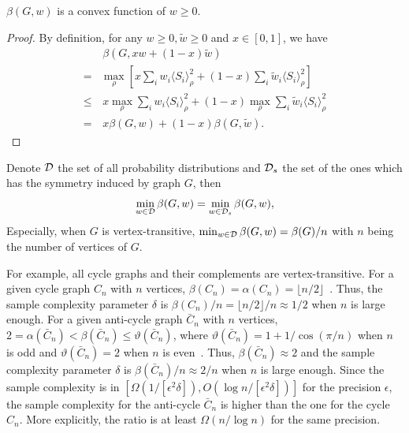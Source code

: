 \begin{lemma}
  $\beta(G,w)$ is a convex function of $w \ge 0$.
\end{lemma}
\begin{proof}
  By definition, for any $w\ge 0, \tilde{w}\ge 0$ and $x\in [0,1]$, we have
  \begin{align}
   & \,\beta(G,x w + (1-x) \tilde{w})\nonumber\\ 
    =& \max_{\rho}[x \sum_i w_{i} \langle S_i\rangle_{\rho}^2 + (1-x) \sum_i \tilde{w}_{i} \langle S_i\rangle_{\rho}^2]\nonumber\\
    \le& \,x\max_{\rho} \sum_i w_{i} \langle S_i\rangle_{\rho}^2 + (1-x) \max_{\rho}\sum_i \tilde{w}_{i} \langle S_i\rangle_{\rho}^2\nonumber\\
    =& \,x \beta(G,w) + (1-x)\beta(G,\tilde{w}).
  \end{align}
\end{proof}
\begin{theorem}
Denote ${\cal D}$ the set of all probability distributions and ${\cal D}_s$ the set of the ones which has the symmetry induced by graph $G$, then
  \begin{equation}
    \min_{w\in {\cal D}} \beta(G,w) = \min_{w\in {\cal D}_s} \beta(G,w),
  \end{equation}
  Especially, when $G$ is vertex-transitive, $\min_{w\in {\cal D}} \beta(G,w) = \beta(G)/n$ with $n$ being the number of vertices of $G$.
\end{theorem}
For example, all cycle graphs and their complements are vertex-transitive. For a given cycle graph $C_n$ with $n$ vertices, $\beta(C_n) = \alpha(C_n) = \lfloor n/2 \rfloor$~\cite{xu2023bounding}. Thus, the sample complexity parameter $\delta$ is $\beta(C_n)/n = \lfloor n/2 \rfloor/n \approx 1/2$ when $n$ is large enough. 
For a given anti-cycle graph $\bar{C}_n$ with $n$ vertices, $2= \alpha(\bar{C}_n) < \beta(\bar{C}_n) \le \vartheta(\bar{C}_n)$, where $\vartheta(\bar{C}_n) = 1+1/\cos(\pi/n)$ when $n$ is odd and $\vartheta(\bar{C}_n) = 2$ when $n$ is even~\cite{lovasz1979shannon}. Thus, $\beta(\bar{C}_n)\approx 2$ and the sample complexity parameter $\delta$ is $\beta(\bar{C}_n)/n \approx 2/n$ when $n$ is large enough. Since the sample complexity is in $[\Omega(1/[\epsilon^2 \delta]), O(\log n/[\epsilon^2 \delta])]$ for the precision $\epsilon$, the sample complexity for the anti-cycle $\bar{C}_n$ is higher than the one for the cycle $C_n$. More explicitly, the ratio is at least $\Omega(n/\log n)$ for the same precision.

